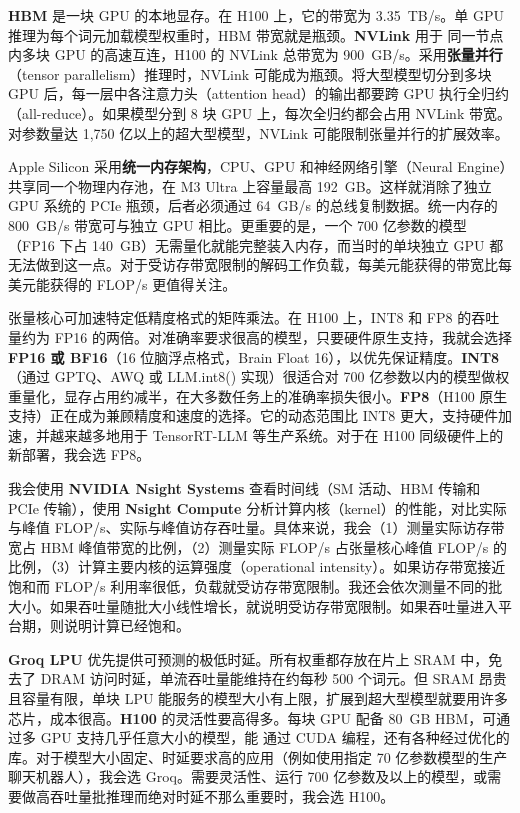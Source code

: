 \begin{interview}
\textbf{HBM} 是一块 GPU 的本地显存。在 H100 上，它的带宽为 3.35~TB/s。单 GPU 推理为每个词元加载模型权重时，HBM 带宽就是瓶颈。\textbf{NVLink} 用于
同一节点内多块 GPU 的高速互连，H100 的 NVLink 总带宽为 900~GB/s。采用\textbf{张量并行}（tensor parallelism）推理时，NVLink 可能成为瓶颈。将大型模型切分到多块 GPU 后，每一层中各注意力头（attention head）的输出都要跨 GPU 执行全归约（all-reduce）。如果模型分到 8 块 GPU 上，每次全归约都会占用 NVLink 带宽。对参数量达 1,750 亿以上的超大型模型，NVLink 可能限制张量并行的扩展效率。

Apple Silicon 采用\textbf{统一内存架构}，CPU、GPU 和神经网络引擎（Neural Engine）共享同一个物理内存池，在 M3 Ultra 上容量最高 192~GB。这样就消除了独立 GPU 系统的 PCIe 瓶颈，后者必须通过 64~GB/s 的总线复制数据。统一内存的 800~GB/s 带宽可与独立 GPU 相比。更重要的是，一个 700 亿参数的模型（FP16 下占 140~GB）无需量化就能完整装入内存，而当时的单块独立 GPU 都无法做到这一点。对于受访存带宽限制的解码工作负载，每美元能获得的带宽比每美元能获得的 FLOP/s 更值得关注。

张量核心可加速特定低精度格式的矩阵乘法。在 H100 上，INT8 和 FP8 的吞吐量约为 FP16 的两倍。对准确率要求很高的模型，只要硬件原生支持，我就会选择 \textbf{FP16 或 BF16}（16 位脑浮点格式，Brain Float 16），以优先保证精度。\textbf{INT8}（通过 GPTQ、AWQ 或 LLM.int8() 实现）很适合对 700 亿参数以内的模型做权重量化，显存占用约减半，在大多数任务上的准确率损失很小。\textbf{FP8}（H100 原生支持）正在成为兼顾精度和速度的选择。它的动态范围比 INT8 更大，支持硬件加速，并越来越多地用于 TensorRT-LLM 等生产系统。对于在 H100 同级硬件上的新部署，我会选 FP8。

我会使用 \textbf{NVIDIA Nsight Systems} 查看时间线（SM 活动、HBM 传输和 PCIe 传输），使用 \textbf{Nsight Compute} 分析计算内核（kernel）的性能，对比实际与峰值 FLOP/s、实际与峰值访存吞吐量。具体来说，我会（1）测量实际访存带宽占 HBM 峰值带宽的比例，（2）测量实际 FLOP/s 占张量核心峰值 FLOP/s 的比例，（3）计算主要内核的运算强度（operational intensity）。如果访存带宽接近饱和而 FLOP/s 利用率很低，负载就受访存带宽限制。我还会依次测量不同的批大小。如果吞吐量随批大小线性增长，就说明受访存带宽限制。如果吞吐量进入平台期，则说明计算已经饱和。

\textbf{Groq LPU} 优先提供可预测的极低时延。所有权重都存放在片上 SRAM 中，免去了 DRAM 访问时延，单流吞吐量能维持在约每秒 500 个词元。但 SRAM 昂贵且容量有限，单块 LPU 能服务的模型大小有上限，扩展到超大型模型就要用许多芯片，成本很高。\textbf{H100} 的灵活性要高得多。每块 GPU 配备 80~GB HBM，可通过多 GPU 支持几乎任意大小的模型，能
通过 CUDA 编程，还有各种经过优化的库。对于模型大小固定、时延要求高的应用（例如使用指定 70 亿参数模型的生产聊天机器人），我会选 Groq。需要灵活性、运行 700 亿参数及以上的模型，或需要做高吞吐量批推理而绝对时延不那么重要时，我会选 H100。
\end{interview}
